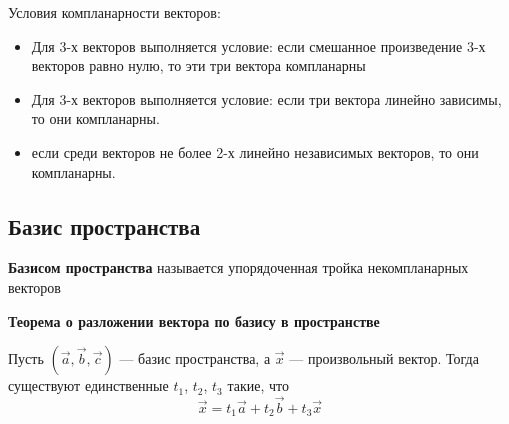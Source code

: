 \documentclass[a4paper]{article}
\begin{document}
    Условия компланарности векторов:\begin{itemize}
                                        \item Для 3-х векторов выполняется условие: если смешанное произведение 3-х векторов равно нулю, то эти три вектора компланарны
                                        \item Для 3-х векторов выполняется условие: если три вектора линейно зависимы, то они компланарны.
                                        \item если среди векторов не более 2-х линейно независимых векторов, то они компланарны.
    \end{itemize}
    \subsection*{Базис пространства}
    \textbf{Базисом пространства }называется упорядоченная тройка некомпланарных
    векторов

    \begin{htheorem}
        \textbf{Теорема о разложении вектора по базису в пространстве}

        Пусть $( \vec{a}, \vec{b}, \vec{c})$ --- базис пространства, а $\vec{x}$ --- произвольный вектор. Тогда существуют единственные $t_1$, $t_2$, $t_3$ такие, что
        \begin{equation}
            \vec{x} = t_1 \vec{a} + t_2 \vec{b} + t_3 \vec{x}
        \end{equation}
    \end{htheorem}
\end{document}
